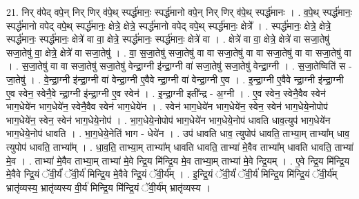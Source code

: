 \documentclass[17pt]{extarticle}
\begin{document}
21. निर् व॑पेद् वपे॒न् निर् णिर् व॑पे॒थ् स्पर्द्ध॑मानः॒ स्पर्द्ध॑मानो वपे॒न् निर् णिर् व॑पे॒थ् स्पर्द्ध॑मानः । . व॒पे॒थ् स्पर्द्ध॑मानः॒ स्पर्द्ध॑मानो वपेद् वपे॒थ् स्पर्द्ध॑मानः॒ क्षेत्रे॒ क्षेत्रे॒ स्पर्द्ध॑मानो वपेद् वपे॒थ् स्पर्द्ध॑मानः॒ क्षेत्रे᳚ । . स्पर्द्ध॑मानः॒ क्षेत्रे॒ क्षेत्रे॒ स्पर्द्ध॑मानः॒ स्पर्द्ध॑मानः॒ क्षेत्रे॑ वा वा॒ क्षेत्रे॒ स्पर्द्ध॑मानः॒ स्पर्द्ध॑मानः॒ क्षेत्रे॑ वा । . क्षेत्रे॑ वा वा॒ क्षेत्रे॒ क्षेत्रे॑ वा सजा॒तेषु॑ सजा॒तेषु॑ वा॒ क्षेत्रे॒ क्षेत्रे॑ वा सजा॒तेषु॑ । . वा॒ स॒जा॒तेषु॑ सजा॒तेषु॑ वा वा सजा॒तेषु॑ वा वा सजा॒तेषु॑ वा वा सजा॒तेषु॑ वा । . स॒जा॒तेषु॑ वा वा सजा॒तेषु॑ सजा॒तेषु॑ वेन्द्रा॒ग्नी इ॑न्द्रा॒ग्नी वा॑ सजा॒तेषु॑ सजा॒तेषु॑ वेन्द्रा॒ग्नी । . स॒जा॒तेष्विति॑ स - जा॒तेषु॑ । . वे॒न्द्रा॒ग्नी इ॑न्द्रा॒ग्नी वा॑ वेन्द्रा॒ग्नी ए॒वैवे न्द्रा॒ग्नी वा॑ वेन्द्रा॒ग्नी ए॒व । . इ॒न्द्रा॒ग्नी ए॒वैवे न्द्रा॒ग्नी इ॑न्द्रा॒ग्नी ए॒व स्वेन॒ स्वेनै॒वे न्द्रा॒ग्नी इ॑न्द्रा॒ग्नी ए॒व स्वेन॑ । . इ॒न्द्रा॒ग्नी इती᳚न्द्र - अ॒ग्नी । . ए॒व स्वेन॒ स्वेनै॒वैव स्वेन॑ भाग॒धेये॑न भाग॒धेये॑न॒ स्वेनै॒वैव स्वेन॑ भाग॒धेये॑न । . स्वेन॑ भाग॒धेये॑न भाग॒धेये॑न॒ स्वेन॒ स्वेन॑ भाग॒धेये॒नोपोप॑ भाग॒धेये॑न॒ स्वेन॒ स्वेन॑ भाग॒धेये॒नोप॑ । . भा॒ग॒धेये॒नोपोप॑ भाग॒धेये॑न भाग॒धेये॒नोप॑ धावति धाव॒त्युप॑ भाग॒धेये॑न भाग॒धेये॒नोप॑ धावति । . भा॒ग॒धेये॒नेति॑ भाग - धेये॑न । . उप॑ धावति धाव॒ त्युपोप॑ धावति॒ ताभ्या॒म् ताभ्या᳚म् धाव॒ त्युपोप॑ धावति॒ ताभ्या᳚म् । . धा॒व॒ति॒ ताभ्या॒म् ताभ्या᳚म् धावति धावति॒ ताभ्या॑ मे॒वैव ताभ्या᳚म् धावति धावति॒ ताभ्या॑ मे॒व । . ताभ्या॑ मे॒वैव ताभ्या॒म् ताभ्या॑ मे॒वे न्द्रि॒य मि॑न्द्रि॒य मे॒व ताभ्या॒म् ताभ्या॑ मे॒वे न्द्रि॒यम् । . ए॒वे न्द्रि॒य मि॑न्द्रि॒य मे॒वैवे न्द्रि॒यं ॅवी॒र्यं॑ ॅवी॒र्य॑ मिन्द्रि॒य मे॒वैवे न्द्रि॒यं ॅवी॒र्य᳚म् । . इ॒न्द्रि॒यं ॅवी॒र्यं॑ ॅवी॒र्य॑ मिन्द्रि॒य मि॑न्द्रि॒यं ॅवी॒र्य॑म् भ्रातृ॑व्यस्य॒ भ्रातृ॑व्यस्य वी॒र्य॑ मिन्द्रि॒य मि॑न्द्रि॒यं ॅवी॒र्य॑म् भ्रातृ॑व्यस्य । \newline
\end{document}
